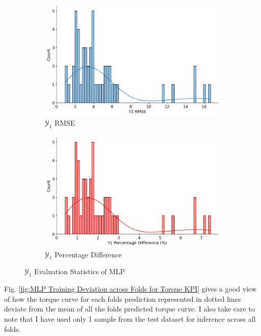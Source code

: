 \documentclass{report} %
\begin{document}
\begin{figure}[H]
    \centering
    \begin{subfigure}{0.5\textwidth}
        \centering
        \includegraphics[width=\textwidth]{./ReportImages/score_MLP_y1.png}
        \caption{$\mathcal{Y}_1$ \ac{RMSE}}
        \label{fig:Y1 RMSE}
    \end{subfigure}\hfill
    \begin{subfigure}{0.5\textwidth}
        \centering
        \includegraphics[width=\textwidth]{./ReportImages/percentage_diff_MLP_y1.png}
        \caption{$\mathcal{Y}_1$ Percentage Difference}
        \label{fig:Y1 Percentage Difference}
    \end{subfigure}
    \caption{$\mathcal{Y}_1$ Evaluation Statistics of \ac{MLP}}
    \label{fig:Y1 Evaluation Statistics MLP}
\end{figure}

Fig. \ref{fig:MLP Training Deviation across Folds for Torque KPI} gives a good view of how the torque curve for each folds prediction represented in dotted lines deviate 
from the mean of all the folds predicted torque curve. I also take care to note that I have used only 1 sample from the test dataset for inference across all folds.\\
\end{document}
